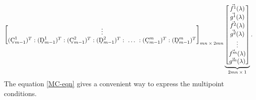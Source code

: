 \documentclass[10pt,reqno,oneside,a4paper]{article}
\begin{document}
\begin{align}
{\begin{bmatrix}
\vdots \\
(\textup{\c{C}}^1_{m-1})^T : (\textup{\c{D}}^1_{m-1})^T : (\textup{\c{C}}^2_{m-1})^T : (\textup{\c{D}}^2_{m-1})^T :~ \ldots ~: (\textup{\c{C}}^m_{m-1})^T : (\textup{\c{D}}^m_{m-1})^T \\
\end{bmatrix}}_\text{$mn \times 2mn$}
\underbrace{\begin{bmatrix}  \vec{f^1}(\lambda) \\ \vec{g^1}(\lambda) \\ \vec{f^2}(\lambda) \\ \vec{g^2}(\lambda) \\ \vdots \\ \vec{f^m}(\lambda) \\ \vec{g^m}(\lambda)  \end{bmatrix}}_\text{$2mn \times 1$}.\label{MC-eqn}
\end{align}
The equation \eqref{MC-eqn} gives a convenient way to express the multipoint conditions. 
\end{document}
